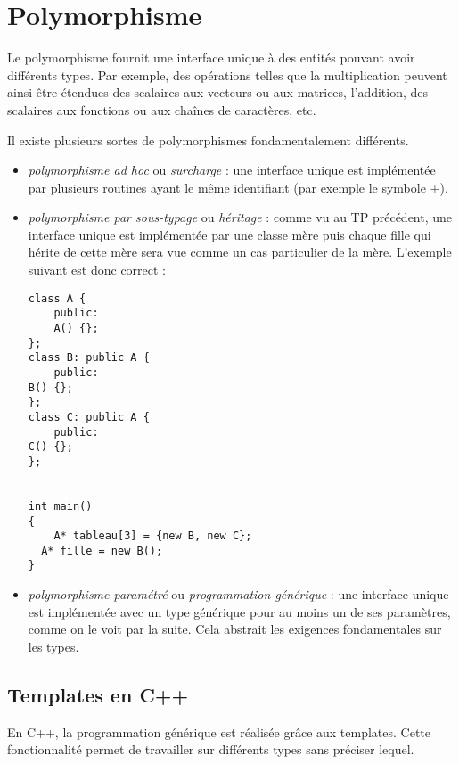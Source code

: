 \documentclass[abstracton]{scrartcl}
\begin{document}
\lstset{language=C++}

\section{Polymorphisme}
\label{sec:polymorphisme}


Le polymorphisme fournit une interface unique à des entités pouvant avoir différents types. Par exemple, des opérations telles que la multiplication peuvent ainsi être étendues des scalaires aux vecteurs ou aux matrices, l'addition, des scalaires aux fonctions ou aux chaînes de caractères, etc.

Il existe plusieurs sortes de polymorphismes fondamentalement différents.
\begin{itemize}
    \item \emph{polymorphisme ad hoc} ou \emph{surcharge} : une interface unique est implémentée par plusieurs routines ayant le même identifiant (par exemple le symbole +).
    \item \emph{polymorphisme par sous-typage} ou \emph{héritage} : comme vu au TP précédent, une interface unique est implémentée par une classe mère puis chaque fille qui hérite de cette mère sera vue comme un cas particulier de la mère. L'exemple suivant est donc correct :
        \begin{lstlisting}
class A {
    public:
    A() {};
};
class B: public A {
    public:
B() {};
};
class C: public A {
    public:
C() {};
};


int main()
{
    A* tableau[3] = {new B, new C};
  A* fille = new B();
}
        \end{lstlisting}

    \item \emph{polymorphisme paramétré} ou \emph{programmation générique} :	une interface unique est implémentée avec un type générique pour au moins un de ses paramètres, comme on le voit par la suite. Cela abstrait les exigences fondamentales sur les types.


\end{itemize}





\subsection{Templates en C++}

En C++, la programmation générique est réalisée grâce aux templates. Cette fonctionnalité permet de travailler sur différents types sans préciser lequel.
\end{document}
